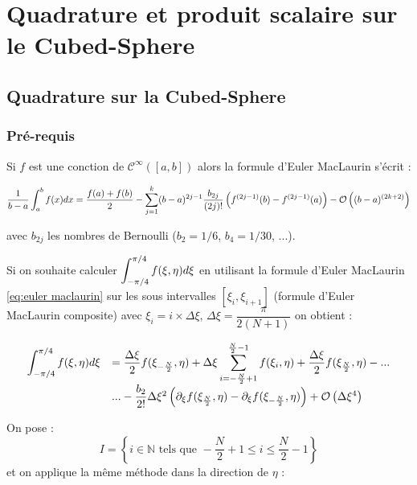 
\chapter{Quadrature et produit scalaire sur le Cubed-Sphere}


\section{Quadrature sur la Cubed-Sphere}


\subsection{Pré-requis} %

Si $f$ est une conction de $\mathcal{C}^{\infty}([a,b])$ alors la formule d'Euler MacLaurin s'écrit :

\begin{equation}
\dfrac{1}{b-a} \displaystyle\int_a^b f(x)dx = \dfrac{f(a)+f(b)}{2} - \displaystyle\sum\limits_{j=1}^k (b-a)^{2j-1} \dfrac{b_{2j}}{(2j)!} \left( f^{(2j-1)}(b) - f^{(2j-1)}(a) \right) - \mathcal{O}\left( (b-a)^{(2k+2)} \right)
\label{eq:euler maclaurin}
\end{equation}

avec $b_{2j}$ les nombres de Bernoulli ($b_2=1/6$, $b_4=1/30$, ...).

Si on souhaite calculer $\displaystyle\int_{-\pi/4}^{\pi/4} f(\xi,\eta)d\xi$ en utilisant la formule d'Euler MacLaurin \eqref{eq:euler maclaurin} sur les sous intervalles $[\xi_i, \xi_{i+1}]$ (formule d'Euler MacLaurin composite) avec $\xi_i= i \times \Delta \xi$, $\Delta \xi = \dfrac{\pi}{2(N+1)}$ on obtient :

\begin{equation}
\begin{array}{rl}
\displaystyle\int_{-\pi/4}^{\pi/4} f(\xi,\eta)d\xi & = \dfrac{\Delta \xi}{2} f(\xi_{-\frac{N}{2}},\eta) +  \Delta \xi \displaystyle\sum\limits_{i=-\frac{N}{2}+1}^{\frac{N}{2}-1} f(\xi_i,\eta) + \frac{\Delta \xi}{2} f(\xi_{\frac{N}{2}},\eta)- ...\\
                                       & ... - \dfrac{b_2}{2!} \Delta \xi^2 \left( \partial_\xi f(\xi_{\frac{N}{2}},\eta) - \partial_\xi f(\xi_{-\frac{N}{2}},\eta) \right) + \mathcal{O} \left( \Delta \xi ^4 \right)
\end{array}
\end{equation}

On pose : $$I = \left\lbrace i\in\mathbb{N} \text{ tels que } -\frac{N}{2}+1 \leq i \leq \frac{N}{2}-1 \right\rbrace$$ et on applique la même méthode dans la direction de $\eta$  :

